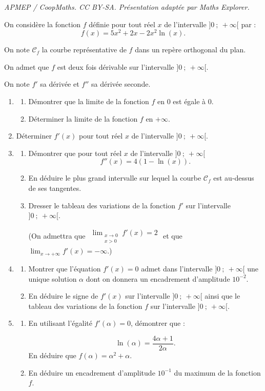\documentclass[10pt]{article}
\begin{document}
\noindent\textit{APMEP / CoopMaths. CC BY-SA. Présentation adaptée par Maths Explorer.}\par\medskip
\medskip

On considère la fonction $f$ définie pour tout réel $x$ de l'intervalle $]0~;~+\infty[$  par :
\[f(x) = 5x^2 + 2x - 2x^2\ln (x).\]

On note $\mathcal{C}_f$ la courbe représentative de $f$ dans un repère orthogonal du plan.

On admet que $f$ est deux fois dérivable sur l'intervalle $]0~;~+\infty[$.

On note $f'$ sa dérivée et $f''$ sa dérivée seconde.

\medskip

\begin{enumerate}
\item 
	\begin{enumerate}
		\item Démontrer que la limite de la fonction $f$ en $0$ est égale à $0$.
		\item Déterminer la limite de la fonction $f$ en $+ \infty$.
	\end{enumerate}
\item Déterminer $f'(x)$ pour tout réel $x$ de l'intervalle $]0~;~+\infty[$.
\item 
	\begin{enumerate}
		\item Démontrer que pour tout réel $x$ de l'intervalle $]0~;~+\infty[$
\[f''(x) = 4(1 - \ln (x)).\]
		\item En déduire le plus grand intervalle sur lequel la courbe $\mathcal{C}_f$ est au-dessus de ses tangentes.
		\item Dresser le tableau des variations de la fonction $f'$ sur l'intervalle $]0~;~+\infty[$.

(On admettra que $\begin{gathered}\displaystyle\lim_{\substack{x \to 0\\x>0}} f'(x) = 2\end{gathered}$ et que $\displaystyle\lim_{x \to + \infty} f'(x) = - \infty$.)
	\end{enumerate}	
\item 
	\begin{enumerate}
		\item Montrer que l'équation $f'(x) = 0$ admet dans l'intervalle $]0~;~+\infty[$ une unique solution $\alpha$ dont on donnera un encadrement d'amplitude $10^{-2}$.
		\item En déduire le signe de $f'(x)$ sur l'intervalle $]0~;~+\infty[$ ainsi que le tableau des variations de la fonction $f$ sur l'intervalle $]0~;~+\infty[$.
	\end{enumerate}
\item 
	\begin{enumerate}
		\item En utilisant l'égalité $f'(\alpha) = 0$, démontrer que : 
		
\[\ln (\alpha) = \dfrac{4\alpha + 1}{2\alpha}.\]
 En déduire que $f(\alpha) = \alpha^2 + \alpha$.
		\item En déduire un encadrement d'amplitude $10^{-1}$ du maximum de la fonction $f$.
	\end{enumerate}
\end{enumerate}
\end{document}
